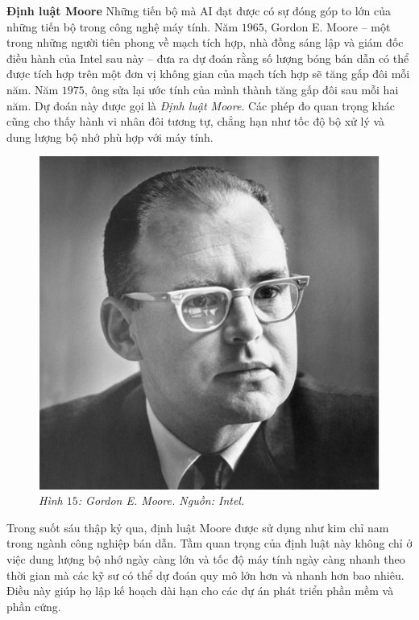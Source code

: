\begin{multicols}{2}
	\vskip 0.1cm
	\textbf{\color{cackithi}Định luật Moore}
	\vskip 0.1cm
	Những tiến bộ mà AI đạt được có sự đóng góp to lớn của những tiến bộ trong công nghệ máy tính. 
	\vskip 0.1cm
	Năm $1965$, Gordon E. Moore -- một trong những người tiên phong về mạch tích hợp, nhà đồng sáng lập và giám đốc điều hành của Intel sau này -- đưa ra dự đoán rằng số lượng bóng bán dẫn có thể được tích hợp trên một đơn vị không gian của mạch tích hợp sẽ tăng gấp đôi mỗi năm. Năm $1975$, ông sửa lại ước tính của mình thành tăng gấp đôi sau mỗi hai năm. Dự đoán này được gọi là \textit{Định luật Moore}. Các phép đo quan trọng khác cũng cho thấy hành vi nhân đôi tương tự, chẳng hạn như tốc độ bộ xử lý và dung lượng bộ nhớ phù hợp với máy tính. 
	\begin{figure}[H]
		\vspace*{-5pt}
		\centering
		\captionsetup{labelformat= empty, justification=centering}
		\includegraphics[width= 1\linewidth]{Gordon_E._Moore.jpg}
		\caption{\small\textit{\color{cackithi}Hình $15$: Gordon E. Moore. Nguồn: Intel.}}
		\vspace*{-10pt}
	\end{figure}
	Trong suốt sáu thập kỷ qua, định luật Moore được sử dụng như kim chỉ nam trong ngành công nghiệp bán dẫn. Tầm quan trọng của định luật này không chỉ ở việc dung lượng bộ nhớ ngày càng lớn và tốc độ máy tính ngày càng nhanh theo thời gian mà các kỹ sư có thể dự đoán quy mô lớn hơn và nhanh hơn bao nhiêu. Điều này giúp họ lập kế hoạch dài hạn cho các dự án phát triển phần mềm và phần cứng. 

\end{multicols}
